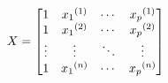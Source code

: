 \documentclass[preview]{standalone}
\begin{document}
\begin{align*}
\special{dvisvgm:raw <g id='unique000'>}X=\begin{bmatrix}1&{x_1}^{(1)}&\cdots&{x_p}^{(1)}\\1&{x_1}^{(2)}&\cdots&{x_p}^{(2)}\\\vdots&\vdots&\ddots&\vdots\\1&{x_1}^{(n)}&\cdots&{x_p}^{(n)}\end{bmatrix}\special{dvisvgm:raw </g>}
\end{align*}
\end{document}

